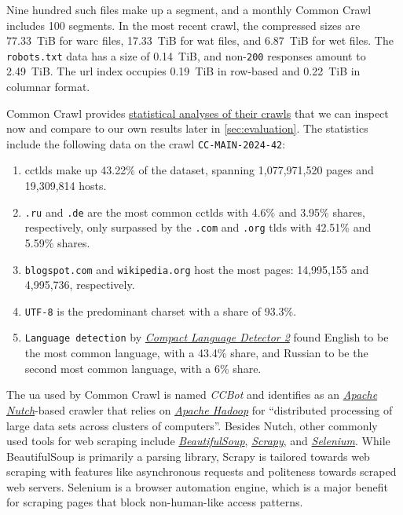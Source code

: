 Nine hundred such files make up a segment, and a monthly Common Crawl includes 100 segments.
In the most recent crawl, the compressed sizes are 77.33~TiB for \ac{warc} files, 17.33~TiB for \ac{wat} files, and 6.87~TiB for \ac{wet} files.
The \texttt{robots.txt} data has a size of 0.14~TiB, and non-\texttt{200} responses amount to 2.49~TiB.
The \ac{url} index occupies 0.19~TiB in row-based and 0.22~TiB in columnar format.

Common Crawl provides \href{https://commoncrawl.github.io/cc-crawl-statistics/}{statistical analyses of their crawls} that we can inspect now and compare to our own results later in \cref{sec:evaluation}.
The statistics include the following data on the crawl \texttt{CC-MAIN-2024-42}:

\begin{enumerate}
    \item \acp{cctld} make up 43.22\% of the dataset, spanning 1,077,971,520 pages and 19,309,814 hosts.
    \item \texttt{.ru} and \texttt{.de} are the most common \acp{cctld} with 4.6\% and 3.95\% shares, respectively, only surpassed by the \texttt{.com} and \texttt{.org} \acp{tld} with 42.51\% and 5.59\% shares.
    \item \texttt{blogspot.com} and \texttt{wikipedia.org} host the most pages: 14,995,155 and 4,995,736, respectively.
    \item \texttt{UTF-8} is the predominant charset with a share of 93.3\%.
    \item \texttt{Language detection} by \href{https://github.com/CLD2Owners/cld2}{\textit{Compact Language Detector 2}} found English to be the most common language, with a 43.4\% share, and Russian to be the second most common language, with a 6\% share.
\end{enumerate}

The \ac{ua} used by Common Crawl is named \textit{CCBot} and identifies as an \href{https://nutch.apache.org/}{\textit{Apache Nutch}}-based crawler that relies on \href{https://hadoop.apache.org/}{\textit{Apache Hadoop}} for ``distributed processing of large data sets across clusters of computers''.
Besides Nutch, other commonly used tools for web scraping include \href{https://www.crummy.com/software/BeautifulSoup/}{\textit{BeautifulSoup}}, \href{https://scrapy.org/}{\textit{Scrapy}}, and \href{https://www.selenium.dev/}{\textit{Selenium}}.
While BeautifulSoup is primarily a parsing library, Scrapy is tailored towards web scraping with features like asynchronous requests and politeness towards scraped web servers.
Selenium is a browser automation engine, which is a major benefit for scraping pages that block non-human-like access patterns.

